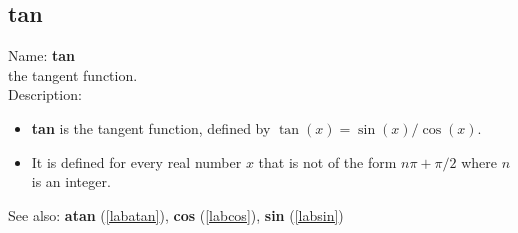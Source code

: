 \subsection{tan}
\label{labtan}
\noindent Name: \textbf{tan}\\
the tangent function.\\
\noindent Description: \begin{itemize}

\item \textbf{tan} is the tangent function, defined by $\tan(x) = \sin(x)/\cos(x)$.

\item It is defined for every real number $x$ that is not of the form $n\pi + \pi/2$ where $n$ is an integer.
\end{itemize}
See also: \textbf{atan} (\ref{labatan}), \textbf{cos} (\ref{labcos}), \textbf{sin} (\ref{labsin})
